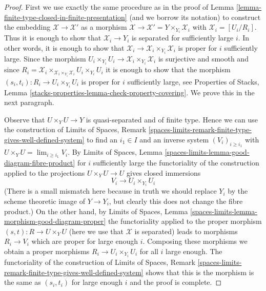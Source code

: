 \begin{proof}
First we use exactly the same procedure as in the proof of
Lemma \ref{lemma-finite-type-closed-in-finite-presentation}
(and we borrow its notation)
to construct the embedding $\mathcal{X} \to \mathcal{X}'$ as a morphism
$\mathcal{X} \to \mathcal{X}' = Y \times_{Y_i} \mathcal{X}_i$ with
$\mathcal{X}_i = [U_i/R_i]$.
Thus it is enough to show that $\mathcal{X}_i \to Y_i$ is
separated for sufficiently large $i$.
In other words, it is enough to show that
$\mathcal{X}_i \to \mathcal{X}_i \times_{Y_i} \mathcal{X}_i$
is proper for $i$ sufficiently large. Since the morphism
$U_i \times_{Y_i} U_i \to \mathcal{X}_i \times_{Y_i} \mathcal{X}_i$
is surjective and smooth and since
$R_i = \mathcal{X}_i
\times_{\mathcal{X}_i \times_{Y_i} \mathcal{X}_i} U_i \times_{Y_i} U_i$
it is enough to show that the morphism
$(s_i, t_i) : R_i \to U_i \times_{Y_i} U_i$
is proper for $i$ sufficiently large, see
Properties of Stacks, Lemma
\ref{stacks-properties-lemma-check-property-covering}.
We prove this in the next paragraph.

\medskip\noindent
Observe that $U \times_Y U \to Y$ is quasi-separated and of finite type.
Hence we can use the construction of 
Limits of Spaces, Remark
\ref{spaces-limits-remark-finite-type-gives-well-defined-system}
to find an $i_1 \in I$ and an inverse system $(V_i)_{i \geq i_1}$
with $U \times_Y U = \lim_{i \geq i_1} V_i$.
By Limits of Spaces, Lemma \ref{spaces-limits-lemma-good-diagram-fibre-product}
for $i$ sufficiently large the functoriality of the construction
applied to the projections $U \times_Y U \to U$
gives closed immersions
$$
V_i \to U_i \times_{Y_i} U_i
$$
(There is a small mismatch here because in truth we should replace
$Y_i$ by the scheme theoretic image of $Y \to Y_i$, but clearly this
does not change the fibre product.)
On the other hand, by Limits of Spaces, Lemma
\ref{spaces-limits-lemma-morphism-good-diagram-proper}
the functoriality applied to the proper morphism
$(s, t) : R \to U \times_Y U$ (here we use that $\mathcal{X}$ is separated)
leads to morphisms $R_i \to V_i$ which are proper for
large enough $i$.
Composing these morphisms we obtain a proper morphisms
$R_i \to U_i \times_{Y_i} U_i$ for all $i$ large enough.
The functoriality of the construction of
Limits of Spaces, Remark
\ref{spaces-limits-remark-finite-type-gives-well-defined-system}
shows that this is the morphism is the same as $(s_i, t_i)$
for large enough $i$ and the proof is complete.
\end{proof}














